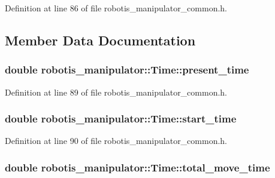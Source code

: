 Definition at line 86 of file robotis\+\_\+manipulator\+\_\+common.\+h.



\subsection{Member Data Documentation}
\subsubsection[{\texorpdfstring{present\+\_\+time}{present_time}}]{\setlength{\rightskip}{0pt plus 5cm}double robotis\+\_\+manipulator\+::\+Time\+::present\+\_\+time}\hypertarget{structrobotis__manipulator_1_1_time_ad2cd4e29dff6c5491cc57abdfe1f8655}{}\label{structrobotis__manipulator_1_1_time_ad2cd4e29dff6c5491cc57abdfe1f8655}


Definition at line 89 of file robotis\+\_\+manipulator\+\_\+common.\+h.

\subsubsection[{\texorpdfstring{start\+\_\+time}{start_time}}]{\setlength{\rightskip}{0pt plus 5cm}double robotis\+\_\+manipulator\+::\+Time\+::start\+\_\+time}\hypertarget{structrobotis__manipulator_1_1_time_a9381eb504cea1e8405182cfc7e9abe13}{}\label{structrobotis__manipulator_1_1_time_a9381eb504cea1e8405182cfc7e9abe13}


Definition at line 90 of file robotis\+\_\+manipulator\+\_\+common.\+h.

\subsubsection[{\texorpdfstring{total\+\_\+move\+\_\+time}{total_move_time}}]{\setlength{\rightskip}{0pt plus 5cm}double robotis\+\_\+manipulator\+::\+Time\+::total\+\_\+move\+\_\+time}\hypertarget{structrobotis__manipulator_1_1_time_af1ee3f302af9a5fb1201124a89a9f4c0}{}\label{structrobotis__manipulator_1_1_time_af1ee3f302af9a5fb1201124a89a9f4c0}


